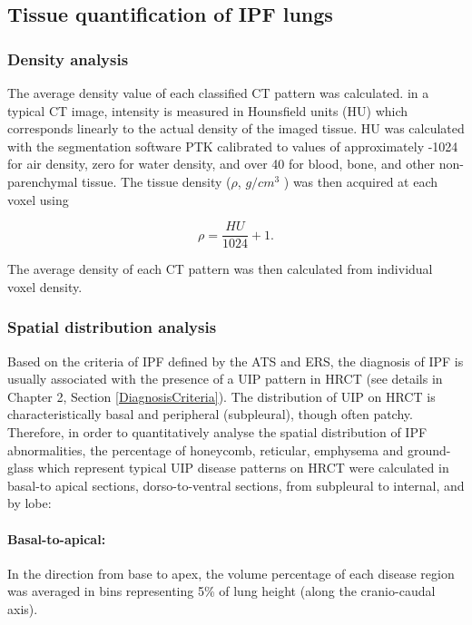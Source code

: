 \subsection{Tissue quantification of IPF lungs} \label{TissueQuantification}
\subsubsection{Density analysis}
The average density value of each classified CT pattern was calculated. in a typical CT image, intensity is measured in Hounsfield units (HU) which corresponds linearly to the actual density of the imaged tissue. HU was calculated with the segmentation software PTK calibrated to values of approximately -1024 for air density, zero for water density, and over 40 for blood, bone, and other non-parenchymal tissue. The tissue density ($\rho$, $g/cm^3$ ) was then acquired at each voxel using

\begin{equation}
\rho = \frac{HU}{1024} + 1.
\end{equation}

The average density of each CT pattern was then calculated from individual voxel density.

\subsubsection{Spatial distribution analysis}
Based on the criteria of IPF defined by the ATS and ERS, the diagnosis of IPF is usually associated with the presence of a UIP pattern in HRCT (see details in Chapter 2, Section \ref{DiagnosisCriteria}). The distribution of UIP on HRCT is characteristically basal and peripheral (subpleural), though often patchy. Therefore, in order to quantitatively analyse the spatial distribution of IPF abnormalities, the percentage of honeycomb, reticular, emphysema and ground-glass which represent typical UIP disease patterns on HRCT were calculated in basal-to apical sections, dorso-to-ventral sections, from subpleural to internal, and by lobe: 
\newpage

\paragraph{Basal-to-apical:} In the direction from base to apex, the volume percentage of each disease region was averaged in bins representing 5\% of lung height (along the cranio-caudal axis). 

